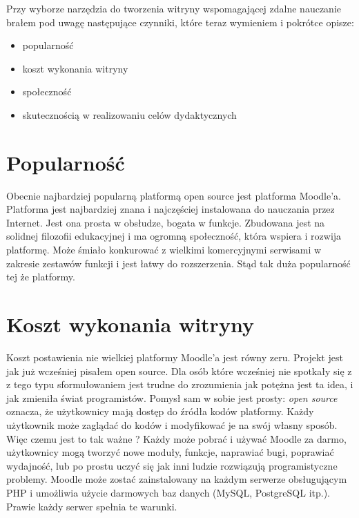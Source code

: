 \hspace{1cm} Przy wyborze narzędzia do tworzenia witryny wspomagającej zdalne nauczanie brałem pod uwagę następujące czynniki, które teraz wymieniem i pokrótce opisze:
	\begin{itemize}
		\item popularność
		\item koszt wykonania witryny
		\item społeczność
		\item skutecznością w realizowaniu celów dydaktycznych
	\end{itemize} 
\section{Popularność} \label{roz:popularnosc_moodle}
\hspace{1cm}  Obecnie najbardziej popularną platformą open source jest platforma Moodle'a. Platforma jest najbardziej znana i najczęściej instalowana do nauczania przez Internet. Jest ona prosta w obsłudze, bogata w funkcje. Zbudowana jest na solidnej filozofii edukacyjnej i ma ogromną społeczność, która wspiera i rozwija platformę. Może śmiało konkurować z wielkimi komercyjnymi serwisami w zakresie zestawów funkcji i jest łatwy do rozszerzenia. Stąd tak duża popularność tej że platformy.
\section{Koszt wykonania witryny} \label{roz:koszt}
\hspace{1cm} Koszt postawienia nie wielkiej platformy Moodle'a jest równy zeru. Projekt jest jak już wcześniej pisałem open source. Dla osób które wcześniej nie spotkały się z z tego typu sformułowaniem jest trudne do zrozumienia jak potężna jest ta idea, i jak zmieniła świat programistów. Pomysł sam w sobie jest prosty: \textit{open source} oznacza, że użytkownicy mają dostęp do źródła kodów platformy. Każdy użytkownik może zaglądać do kodów i modyfikować je na swój własny sposób. Więc czemu jest to tak ważne ? Każdy może pobrać i używać Moodle za darmo, użytkownicy mogą tworzyć nowe moduły, funkcje, naprawiać bugi, poprawiać wydajność, lub po prostu uczyć się jak inni ludzie rozwiązują programistyczne problemy. Moodle może zostać zainstalowany na każdym serwerze obsługującym PHP i umożliwia użycie darmowych baz danych (MySQL, PostgreSQL itp.). Prawie każdy serwer spełnia te warunki.
